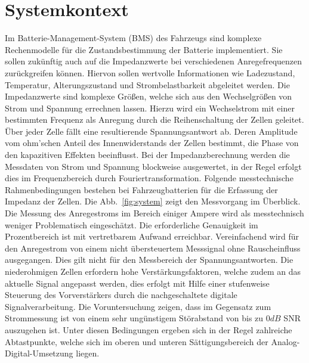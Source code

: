 \section{Systemkontext}
Im Batterie-Management-System (BMS)  des Fahrzeugs sind komplexe Rechenmodelle für die Zustandsbestimmung der Batterie implementiert. Sie sollen zukünftig auch auf die Impedanzwerte bei verschiedenen Anregefrequenzen zurückgreifen können. Hiervon sollen wertvolle Informationen wie Ladezustand, Temperatur, Alterungszustand und Strombelastbarkeit abgeleitet werden. Die Impedanzwerte sind komplexe Größen, welche sich aus den Wechselgrößen von Strom und Spannung errechnen lassen. Hierzu wird ein Wechselstrom mit einer bestimmten Frequenz als Anregung durch die Reihenschaltung der Zellen geleitet. Über jeder Zelle fällt eine resultierende Spannungsantwort ab. Deren Amplitude vom ohm'schen Anteil des Innenwiderstands der Zellen bestimmt, die Phase von den kapazitiven Effekten beeinflusst.
Bei der Impedanzberechnung werden die Messdaten von Strom und Spannung blockweise ausgewertet, in der Regel erfolgt dies im Frequenzbereich durch Fouriertransformation. Folgende messtechnische Rahmenbedingungen bestehen bei Fahrzeugbatterien für die Erfassung der Impedanz der Zellen. Die Abb.~\ref{fig:system} zeigt den Messvorgang im Überblick. Die Messung des Anregestroms im Bereich einiger Ampere wird als messtechnisch weniger Problematisch eingeschätzt. Die erforderliche Genauigkeit im Prozentbereich ist mit vertretbarem Aufwand erreichbar. Vereinfachend wird für den Anregestrom von einem nicht übersteuertem Messsignal ohne Rauscheinfluss ausgegangen. Dies gilt nicht für den Messbereich der Spannungsantworten. Die niederohmigen Zellen erfordern hohe Verstärkungsfaktoren, welche zudem an das aktuelle Signal angepasst werden, dies erfolgt mit Hilfe einer stufenweise Steuerung des Vorverstärkers durch die nachgeschaltete digitale Signalverarbeitung. Die Voruntersuchung zeigen, dass im Gegensatz zum Strommessung ist von einem sehr ungünstigem Störabstand von bis zu $0dB$ SNR auszugehen ist. Unter diesen Bedingungen ergeben sich in der Regel zahlreiche Abtastpunkte, welche sich im oberen und unteren Sättigungsbereich der Analog-Digital-Umsetzung liegen.

